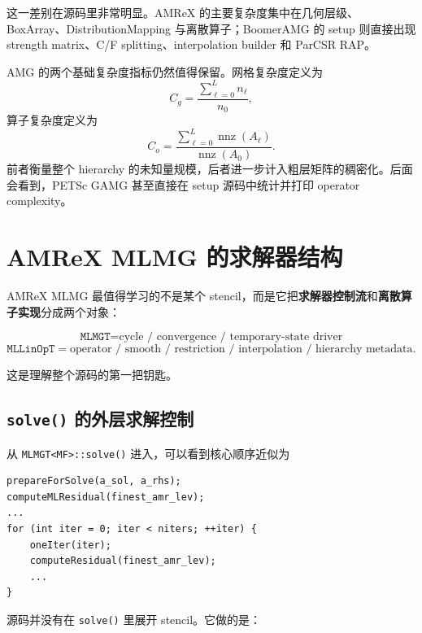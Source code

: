 这一差别在源码里非常明显。AMReX 的主要复杂度集中在几何层级、BoxArray、DistributionMapping 与离散算子；BoomerAMG 的 setup 则直接出现 strength matrix、C/F splitting、interpolation builder 和 ParCSR RAP。

AMG 的两个基础复杂度指标仍然值得保留。网格复杂度定义为
\begin{equation}
C_g
=
\frac{\sum_{\ell=0}^{L}n_\ell}{n_0},
\label{eq:grid-complexity}
\end{equation}
算子复杂度定义为
\begin{equation}
C_o
=
\frac{\sum_{\ell=0}^{L}\operatorname{nnz}(A_\ell)}
{\operatorname{nnz}(A_0)}.
\label{eq:operator-complexity}
\end{equation}
前者衡量整个 hierarchy 的未知量规模，后者进一步计入粗层矩阵的稠密化。后面会看到，PETSc GAMG 甚至直接在 setup 源码中统计并打印 operator complexity。

\section{AMReX MLMG 的求解器结构}
\label{sec:software-amrex-source}

AMReX MLMG 最值得学习的不是某个 stencil，而是它把\textbf{求解器控制流}和\textbf{离散算子实现}分成两个对象：

\begin{equation}
\boxed{
\texttt{MLMGT}
=
\text{cycle / convergence / temporary-state driver}
}
\end{equation}
\begin{equation}
\boxed{
\texttt{MLLinOpT}
=
\text{operator / smooth / restriction / interpolation / hierarchy metadata}.
}
\end{equation}

这是理解整个源码的第一把钥匙。

\subsection{\texttt{solve()} 的外层求解控制}

从 \texttt{MLMGT<MF>::solve()} 进入，可以看到核心顺序近似为

\begin{verbatim}
prepareForSolve(a_sol, a_rhs);
computeMLResidual(finest_amr_lev);
...
for (int iter = 0; iter < niters; ++iter) {
    oneIter(iter);
    computeResidual(finest_amr_lev);
    ...
}
\end{verbatim}

源码并没有在 \texttt{solve()} 里展开 stencil。它做的是：

